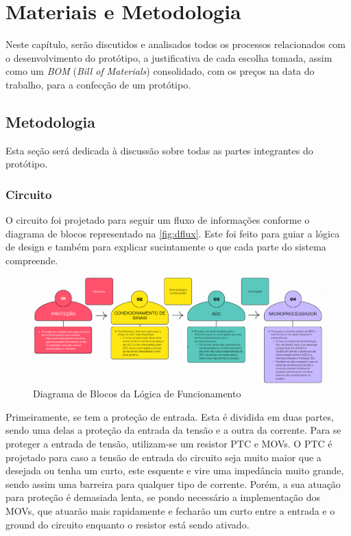 
\chapter{Materiais e Metodologia}\label{cap:materialemetodos}

Neste capítulo, serão discutidos e analisados todos os processos relacionados com o desenvolvimento do protótipo, a justificativa de cada escolha tomada, assim como um \textit{\gls{BOM}} (\textit{Bill of Materials}) consolidado, com os preços na data do trabalho, para a confecção de um protótipo.


\section{Metodologia}\label{sec:metodo}

Esta seção será dedicada à discussão sobre todas as partes integrantes do protótipo.

\subsection{Circuito}\label{circuit}

O circuito foi projetado para seguir um fluxo de informações conforme o diagrama de blocos representado na \autoref{fig:dflux}. Este foi feito para guiar a lógica de design e também para explicar sucintamente o que cada parte do sistema compreende.

\begin{figure}[htb!]
    \caption{Diagrama de Blocos da Lógica de Funcionamento}
    \label{fig:dflux}
    \includegraphics[width=1.0\textwidth]{figuras/dblocflux.png}
    \fonte{}
\end{figure}

Primeiramente, se tem a proteção de entrada. Esta é dividida em duas partes, sendo uma delas a proteção da entrada da tensão e a outra da corrente. Para se proteger a entrada de tensão, utilizam-se um resistor \gls{PTC} e \gls{MOV}s. O \gls{PTC} é projetado para caso a tensão de entrada do circuito seja muito maior que a desejada ou tenha um curto, este esquente e vire uma impedância muito grande, sendo assim uma barreira para qualquer tipo de corrente. Porém, a sua atuação para proteção é demasiada lenta, se pondo necessário a implementação dos \gls{MOV}s, que atuarão mais rapidamente e fecharão um curto entre a entrada e o ground do circuito enquanto o resistor está sendo ativado.

